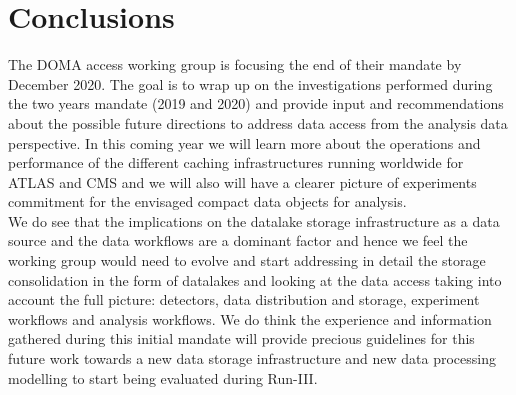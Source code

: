 \section{Conclusions}
The DOMA access working group is focusing the end of their mandate by December 2020. The goal is to wrap up on the investigations performed during the two years mandate (2019 and 2020) and provide input and recommendations about the possible future directions to address data access from the analysis data perspective. In this coming year we will learn more about the operations and performance of the different caching infrastructures running worldwide for ATLAS and CMS and we will also will have a clearer picture of experiments commitment for the envisaged compact data objects for analysis.\\
We do see that the implications on the datalake storage infrastructure as a data source and the data workflows are a dominant factor and hence we feel the working group would need to evolve and start addressing in detail the storage consolidation in the form of datalakes and looking at the data access taking into account the full picture: detectors, data distribution and storage, experiment workflows and analysis workflows. We do think the experience and information gathered during this initial mandate will provide precious guidelines for this future work towards a new data storage infrastructure and new data processing modelling to start being evaluated during Run-III.